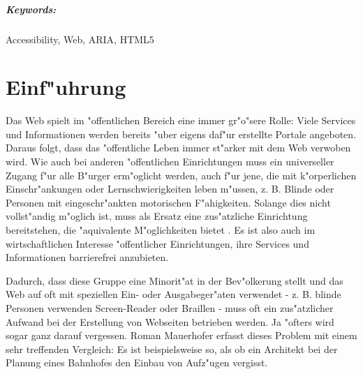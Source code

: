 \documentclass[a4paper,bibtotoc,oneside]{scrbook}
\begin{document}
\paragraph*{Keywords:} Accessibility, Web, ARIA, HTML5
\newpage


\tableofcontents\thispagestyle{empty}
\newpage

\setcounter{page}{1}

\chapter{Einf"uhrung}
Das Web spielt im "offentlichen Bereich eine immer gr"o"sere Rolle: Viele
Services und Informationen werden bereits "uber eigens daf"ur erstellte Portale angeboten. Daraus folgt, dass das "offentliche Leben immer st"arker mit dem Web verwoben wird. Wie auch bei anderen "offentlichen Einrichtungen muss ein universeller Zugang f"ur alle B"urger erm"oglicht werden, auch f"ur jene, die mit k"orperlichen Einschr"ankungen oder Lernschwierigkeiten leben m"ussen, z. B. Blinde oder Personen mit eingeschr"ankten motorischen F"ahigkeiten. Solange dies nicht vollst"andig m"oglich ist, muss als Ersatz eine zus"atzliche Einrichtung bereitstehen, die "aquivalente M"oglichkeiten bietet \cite[S. 8]{understand_acc}. Es ist also auch im wirtschaftlichen Interesse "offentlicher Einrichtungen, ihre Services und Informationen barrierefrei anzubieten. 

Dadurch, dass diese Gruppe eine Minorit"at in der Bev"olkerung stellt und das Web auf oft mit speziellen Ein- oder Ausgabeger"aten verwendet - z. B. blinde Personen verwenden Screen-Reader oder Braillen - muss oft ein zus"atzlicher Aufwand bei der Erstellung von Webseiten betrieben werden. Ja "ofters wird sogar ganz darauf vergessen\cite[S. 7]{mod_software}. Roman Mauerhofer erfasst dieses Problem mit einem sehr treffenden Vergleich: \glqq Es ist beispielsweise so, als ob ein Architekt bei der Planung eines Bahnhofes den Einbau von Aufz"ugen vergisst.\grqq  \cite[S. 7]{mod_software}
\end{document}
